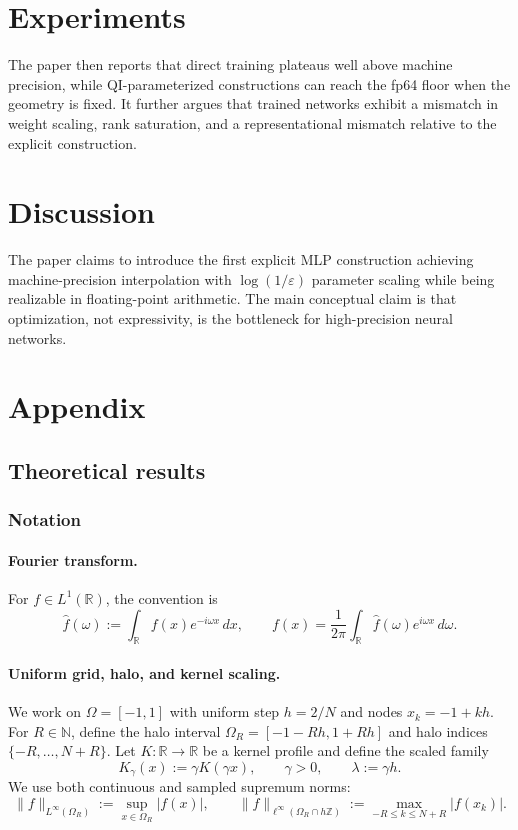 \documentclass[11pt]{article}
\newcommand{\R}{\mathbb{R}}
\newcommand{\Z}{\mathbb{Z}}
\newcommand{\N}{\mathbb{N}}
\newcommand{\eps}{\varepsilon}
\newcommand{\wh}[1]{\widehat{#1}}
\begin{document}
\section{Experiments}
The paper then reports that direct training plateaus well above machine precision, while QI-parameterized constructions can reach the fp64 floor when the geometry is fixed. It further argues that trained networks exhibit a mismatch in weight scaling, rank saturation, and a representational mismatch relative to the explicit construction.

\section{Discussion}
The paper claims to introduce the first explicit MLP construction achieving machine-precision interpolation with $\log(1/\eps)$ parameter scaling while being realizable in floating-point arithmetic. The main conceptual claim is that optimization, not expressivity, is the bottleneck for high-precision neural networks.

\appendix
\section{Appendix}
\subsection{Theoretical results}
\subsubsection{Notation}
\paragraph{Fourier transform.}
For $f\in L^1(\R)$, the convention is
\begin{equation}
\wh f(\omega):=\int_{\R} f(x)e^{-i\omega x}\,dx,
\qquad
f(x)=\frac{1}{2\pi}\int_{\R}\wh f(\omega)e^{i\omega x}\,d\omega.
\label{eq:ft-convention}
\end{equation}

\paragraph{Uniform grid, halo, and kernel scaling.}
We work on $\Omega=[-1,1]$ with uniform step $h=2/N$ and nodes $x_k=-1+kh$. For $R\in\N$, define the halo interval $\Omega_R=[-1-Rh,1+Rh]$ and halo indices $\{-R,\dots,N+R\}$. Let $K:\R\to\R$ be a kernel profile and define the scaled family
\begin{equation}
K_\gamma(x):=\gamma K(\gamma x),
\qquad \gamma>0,
\qquad \lambda:=\gamma h.
\label{eq:appendix-scaled-kernel}
\end{equation}
We use both continuous and sampled supremum norms:
\begin{equation}
\|f\|_{L^\infty(\Omega_R)}:=\sup_{x\in\Omega_R}|f(x)|,
\qquad
\|f\|_{\ell^\infty(\Omega_R\cap h\Z)}:=\max_{-R\le k\le N+R}|f(x_k)|.
\label{eq:norms}
\end{equation}
\end{document}
